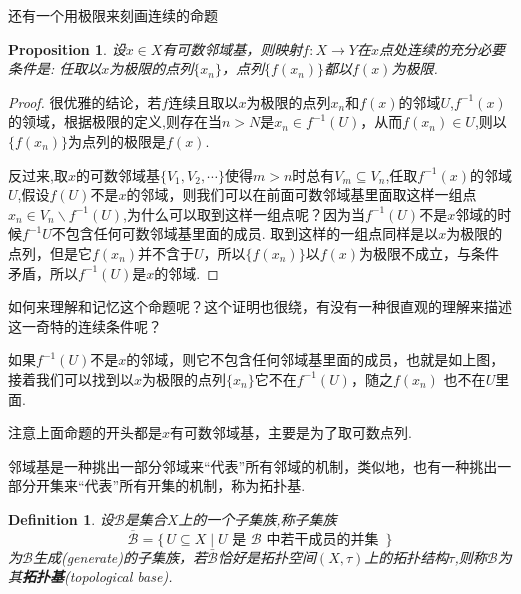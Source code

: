 \documentclass{article}
\newtheorem{proposition}[theorem]{Proposition}
\newtheorem{definition}[theorem]{Definition}
\newcommand*{\xfunc}[4]{{#2}\colon{#3}{#1}{#4}}
\newcommand*{\func}[3]{\xfunc{\to}{#1}{#2}{#3}}
\newcommand\Set[2]{\{\,#1\mid#2\,\}} %
\begin{document}
还有一个用极限来刻画连续的命题

\begin{proposition}
设$x \in X$有可数邻域基，则映射$\func{f}{X}{Y}$在$x$点处连续的充分必要条件是: 任取以$x$为极限的点列$\{x_n\}$，点列$\{f(x_n)\}$都以$f(x)$为极限.
\end{proposition}

\begin{proof}
很优雅的结论，若$f$连续且取以$x$为极限的点列$x_n$和$f(x)$的邻域$U$,$f^{-1}(x)$的领域，根据极限的定义,则存在当$n > N$是$x_n \in f^{-1}(U)$，从而$f(x_n) \in U$,则以$\{f(x_n)\}$为点列的极限是$f(x)$.

反过来,取$x$的可数邻域基$\{V_1,V_2,\cdots\}$使得$m > n$时总有$V_m \subseteq V_n$,任取$f^{-1}(x)$的邻域$U$,假设$f(U)$不是$x$的邻域，则我们可以在前面可数邻域基里面取这样一组点$x_n \in V_n \smallsetminus f^{-1}(U)$,为什么可以取到这样一组点呢？因为当$f^{-1}(U)$不是$x$邻域的时候$f^{-1}{U}$不包含任何可数邻域基里面的成员. 取到这样的一组点同样是以$x$为极限的点列，但是它$f(x_n)$并不含于$U$，所以$\{f(x_n)\}$以$f(x)$为极限不成立，与条件矛盾，所以$f^{-1}(U)$是$x$的邻域.
\end{proof}

如何来理解和记忆这个命题呢？这个证明也很绕，有没有一种很直观的理解来描述这一奇特的连续条件呢？

\begin{center}
\end{center}

如果$f^{-1}(U)$不是$x$的邻域，则它不包含任何邻域基里面的成员，也就是如上图，接着我们可以找到以$x$为极限的点列$\{x_n\}$它不在$f^{-1}(U)$，随之$f(x_n)$ 也不在$U$里面.

注意上面命题的开头都是$x$有可数邻域基，主要是为了取可数点列. 

邻域基是一种挑出一部分邻域来“代表”所有邻域的机制，类似地，也有一种挑出一部分开集来“代表”所有开集的机制，称为拓扑基.

\begin{definition}
设$\mathscr{B}$是集合$X$上的一个子集族,称子集族\[\overline{\mathscr{B}}=\Set{U \subseteq X}{U \text{ 是 } \mathscr{B} \text{ 中若干成员的并集 }}\]为$\mathscr{B}$\textsf{生成}(generate)的子集族，若$\bar{\mathscr{B}}$恰好是拓扑空间$(X,\tau)$上的拓扑结构$\tau$,则称$\mathscr{B}$为其\textbf{拓扑基}(topological base).
\end{definition}
\end{document}
